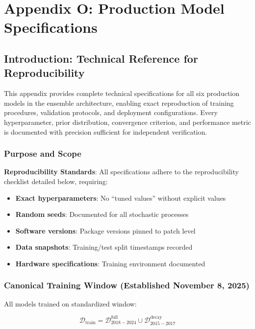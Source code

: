 \chapter{Appendix O: Production Model Specifications}
\label{app:model-specifications}

\section{Introduction: Technical Reference for Reproducibility}

This appendix provides complete technical specifications for all six production models in the ensemble architecture, enabling exact reproduction of training procedures, validation protocols, and deployment configurations. Every hyperparameter, prior distribution, convergence criterion, and performance metric is documented with precision sufficient for independent verification.

\subsection{Purpose and Scope}

\textbf{Reproducibility Standards}: All specifications adhere to the reproducibility checklist detailed below, requiring:

\begin{itemize}
\item \textbf{Exact hyperparameters}: No ``tuned values'' without explicit values
\item \textbf{Random seeds}: Documented for all stochastic processes
\item \textbf{Software versions}: Package versions pinned to patch level
\item \textbf{Data snapshots}: Training/test split timestamps recorded
\item \textbf{Hardware specifications}: Training environment documented
\end{itemize}

\subsection{Canonical Training Window (Established November 8, 2025)}

All models trained on standardized window:

\begin{equation}
\mathcal{D}_{\text{train}} = \mathcal{D}_{2018-2024}^{\text{full}} \cup \mathcal{D}_{2015-2017}^{\text{decay}}
\end{equation}

